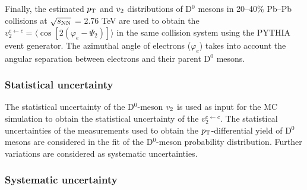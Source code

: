 \documentclass[11pt,a4paper]{article}
\providecommand{\pT}{$p_{\rm T}$ }
\providecommand{\vtwo}{$v_{\rm 2}$ }
\providecommand{\snn}{$\sqrt{s_{\rm NN}}$ }
\begin{document}
Finally, the estimated \pT and \vtwo distributions of D$^{0}$ mesons  in 20--40\%   Pb--Pb collisions at \snn = 2.76 TeV are used to obtain the $v_{2}^{e \leftarrow c} = \langle \cos \left[ 2 \left( \varphi_{e} - \Psi_{2} \right) \right] \rangle$ in the same collision system using the PYTHIA event generator.
The azimuthal angle of electrons  ($\varphi_{e}$) takes into account the angular separation between electrons and their parent D$^{0}$ mesons. 


\subsubsection{Statistical uncertainty}

The statistical uncertainty of the  D$^{0}$-meson $v_{\rm 2}$ is used as input for the MC simulation  to obtain the statistical uncertainty of the  $v_{2}^{e \leftarrow c}$. The statistical uncertainties of the measurements used to obtain the $p_{\rm T}$-differential yield of D$^{0}$ mesons are considered in the fit of the D$^{0}$-meson probability distribution. Further variations are considered as systematic uncertainties.





\subsubsection{Systematic uncertainty}
\end{document}
